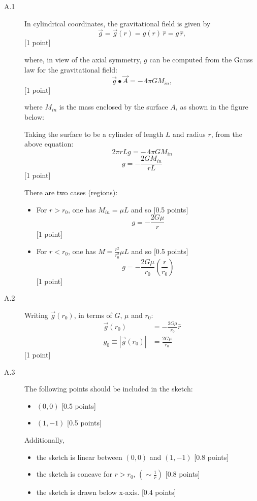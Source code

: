 \begin{description}
\item[A.1] In cylindrical coordinates, the gravitational field is given by
  \[ \vec{g} = \vec{g}(r) = g(r)\,\hat{r} = g\,\hat{r}, \]
  \hfill[1 point]

  where, in view of the axial symmetry, $g$ can be computed from the Gauss
  law for the gravitational field:
  \[ \vec{g}\bullet\vec{A} = -\,4\pi G M_{in}, \]
  \hfill[1 point]

  where $M_{in}$ is the mass enclosed by the surface $A$, as shown in the
  figure below:

  Taking the surface to be a cylinder of length $L$ and radius $r$, from
  the above equation:
  \[ 2\pi r L g = -\,4\pi G M_{in} \]
  \[ g = -\frac{2GM_{in}}{rL} \]
  \hfill[1 point]

  There are two cases (regions):
  \begin{itemize}
  \item For $r > r_0$, one has $M_{in} = \mu L$ and so \hfill[0.5 points]
    \[ g = -\frac{2G\mu}{r} \]
    \hfill[1 point]
  \item For $r < r_0$, one has $M = \frac{r^2}{r_0^2}\mu L$ and so
    \hfill[0.5 points]
    \[ g = -\frac{2G\mu}{r_0}\left(\frac{r}{r_0}\right) \]
    \hfill[1 point]
  \end{itemize}

\item[A.2] Writing $\vec{g}(r_0)$, in terms of $G$, $\mu$ and $r_0$:
  \begin{align*}
  \vec{g}(r_0) &= -\frac{2G\mu}{r_0}\hat{r}\\
  g_0 \equiv \left|\vec{g}(r_0)\right| &= \frac{2G\mu}{r_0}
  \end{align*}
  \hfill[1 point]

\item[A.3] The following points should be included in the sketch:
  \begin{itemize}
  \item $(0, 0)$ \hfill[0.5 points]
  \item $(1, -1)$ \hfill[0.5 points]
  \end{itemize}
  Additionally,
  \begin{itemize}
  \item the sketch is linear between $(0,0)$ and $(1,-1)$
    \hfill[0.8 points]
  \item the sketch is concave for $r > r_0$,
    $\left(\sim\frac{1}{r}\right)$ \hfill[0.8 points]
  \item the sketch is drawn below x-axis. \hfill[0.4 points]
  \end{itemize}


\end{description}
